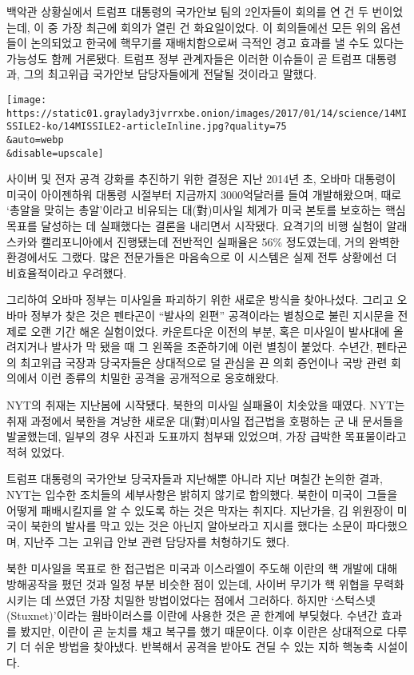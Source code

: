 백악관 상황실에서 트럼프 대통령의 국가안보 팀의 2인자들이 회의를 연 건
두 번이었는데, 이 중 가장 최근에 회의가 열린 건 화요일이었다. 이
회의들에선 모든 위의 옵션들이 논의되었고 한국에 핵무기를 재배치함으로써
극적인 경고 효과를 낼 수도 있다는 가능성도 함께 거론됐다. 트럼프 정부
관계자들은 이러한 이슈들이 곧 트럼프 대통령과, 그의 최고위급 국가안보
담당자들에게 전달될 것이라고 말했다.

\texttt{[image: https://static01.graylady3jvrrxbe.onion/images/2017/01/14/science/14MISSILE2-ko/14MISSILE2-articleInline.jpg?quality=75\\\&auto=webp\\\&disable=upscale]}

사이버 및 전자 공격 강화를 추진하기 위한 결정은 지난 2014년 초, 오바마
대통령이 미국이 아이젠하워 대통령 시절부터 지금까지 3000억달러를 들여
개발해왔으며, 때로 `총알을 맞히는 총알'이라고 비유되는 대(對)미사일
체계가 미국 본토를 보호하는 핵심 목표를 달성하는 데 실패했다는 결론을
내리면서 시작됐다. 요격기의 비행 실험이 알래스카와 캘리포니아에서
진행됐는데 전반적인 실패율은 56\% 정도였는데, 거의 완벽한 환경에서도
그랬다. 많은 전문가들은 마음속으로 이 시스템은 실제 전투 상황에선 더
비효율적이라고 우려했다.

그리하여 오바마 정부는 미사일을 파괴하기 위한 새로운 방식을 찾아나섰다.
그리고 오바마 정부가 찾은 것은 펜타곤이 ``발사의 왼편'' 공격이라는
별칭으로 불린 지시문을 전제로 오랜 기간 해온 실험이었다. 카운트다운
이전의 부분, 혹은 미사일이 발사대에 올려지거나 발사가 막 됐을 때 그
왼쪽을 조준하기에 이런 별칭이 붙었다. 수년간, 펜타곤의 최고위급 국장과
당국자들은 상대적으로 덜 관심을 끈 의회 증언이나 국방 관련 회의에서 이런
종류의 치밀한 공격을 공개적으로 옹호해왔다.

NYT의 취재는 지난봄에 시작됐다. 북한의 미사일 실패율이 치솟았을 때였다.
NYT는 취재 과정에서 북한을 겨냥한 새로운 대(對)미사일 접근법을 호평하는
군 내 문서들을 발굴했는데, 일부의 경우 사진과 도표까지 첨부돼 있었으며,
가장 급박한 목표물이라고 적혀 있었다.

트럼프 대통령의 국가안보 당국자들과 지난해뿐 아니라 지난 며칠간 논의한
결과, NYT는 입수한 조치들의 세부사항은 밝히지 않기로 합의했다. 북한이
미국이 그들을 어떻게 패배시킬지를 알 수 있도록 하는 것은 막자는 취지다.
지난가을, 김 위원장이 미국이 북한의 발사를 막고 있는 것은 아닌지
알아보라고 지시를 했다는 소문이 파다했으며, 지난주 그는 고위급 안보 관련
담당자를 처형하기도 했다.

북한 미사일을 목표로 한 접근법은 미국과 이스라엘이 주도해 이란의 핵
개발에 대해 방해공작을 폈던 것과 일정 부분 비슷한 점이 있는데, 사이버
무기가 핵 위협을 무력화시키는 데 쓰였던 가장 치밀한 방법이었다는 점에서
그러하다. 하지만 `스턱스넷(Stuxnet)'이라는 웜바이러스를 이란에 사용한
것은 곧 한계에 부딪혔다. 수년간 효과를 봤지만, 이란이 곧 눈치를 채고
복구를 했기 때문이다. 이후 이란은 상대적으로 다루기 더 쉬운 방법을
찾아냈다. 반복해서 공격을 받아도 견딜 수 있는 지하 핵농축 시설이다.

